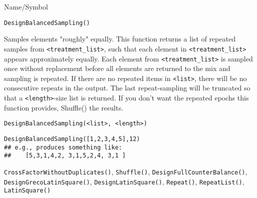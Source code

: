 \begin{desc}{Name/Symbol}
\item[Name/Symbol]  	\verb+DesignBalancedSampling()+

\item[Description] 	Samples elements "roughly" equally.
  		This function returns a list of repeated samples from
 		\verb+<treatment_list>+, such that each element in \verb+<treatment_list>+ 
		appears approximately equally.  Each element from 
		\verb+<treatment_list>+ is sampled once without replacement before 
		all elements are returned to the mix and sampling is repeated.  
		If there are no repeated items in \verb+<list>+, there will be no
 		consecutive repeats in the output.  The last repeat-sampling 
		will be truncated so that a \verb+<length>+-size list is returned.  
		If you don't want the repeated epochs this function provides, 
		Shuffle() the results.

\item[Usage]
\begin{verbatim}
DesignBalancedSampling(<list>, <length>)
\end{verbatim}

\item[Example]
\begin{verbatim}
DesignBalancedSampling([1,2,3,4,5],12)
## e.g., produces something like:
##    [5,3,1,4,2, 3,1,5,2,4, 3,1 ]
\end{verbatim}

\item[See Also]	\verb+CrossFactorWithoutDuplicates()+,
  \verb+Shuffle()+, \verb+DesignFullCounterBalance()+,
  		\verb+DesignGrecoLatinSquare()+, \verb+DesignLatinSquare()+, \verb+Repeat()+, 
		\verb+RepeatList()+,  \verb+LatinSquare()+

\end{desc}

\rl




